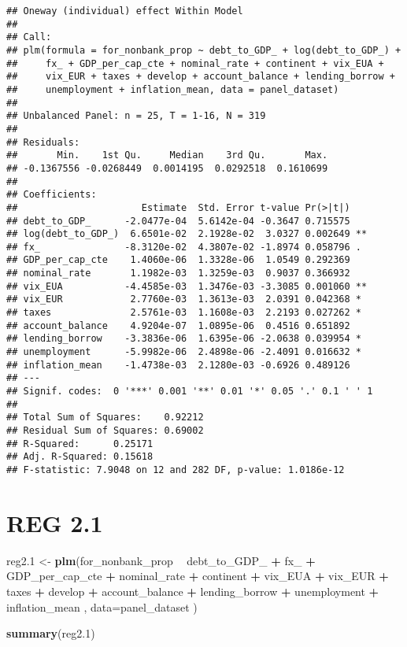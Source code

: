 \documentclass[]{article}
\newenvironment{Shaded}{\begin{snugshade}}{\end{snugshade}}
\newcommand{\KeywordTok}[1]{\textcolor[rgb]{0.13,0.29,0.53}{\textbf{#1}}}
\newcommand{\DataTypeTok}[1]{\textcolor[rgb]{0.13,0.29,0.53}{#1}}
\newcommand{\DecValTok}[1]{\textcolor[rgb]{0.00,0.00,0.81}{#1}}
\newcommand{\StringTok}[1]{\textcolor[rgb]{0.31,0.60,0.02}{#1}}
\newcommand{\OperatorTok}[1]{\textcolor[rgb]{0.81,0.36,0.00}{\textbf{#1}}}
\newcommand{\NormalTok}[1]{#1}
\begin{document}
\begin{verbatim}
## Oneway (individual) effect Within Model
## 
## Call:
## plm(formula = for_nonbank_prop ~ debt_to_GDP_ + log(debt_to_GDP_) + 
##     fx_ + GDP_per_cap_cte + nominal_rate + continent + vix_EUA + 
##     vix_EUR + taxes + develop + account_balance + lending_borrow + 
##     unemployment + inflation_mean, data = panel_dataset)
## 
## Unbalanced Panel: n = 25, T = 1-16, N = 319
## 
## Residuals:
##       Min.    1st Qu.     Median    3rd Qu.       Max. 
## -0.1367556 -0.0268449  0.0014195  0.0292518  0.1610699 
## 
## Coefficients:
##                      Estimate  Std. Error t-value Pr(>|t|)   
## debt_to_GDP_      -2.0477e-04  5.6142e-04 -0.3647 0.715575   
## log(debt_to_GDP_)  6.6501e-02  2.1928e-02  3.0327 0.002649 **
## fx_               -8.3120e-02  4.3807e-02 -1.8974 0.058796 . 
## GDP_per_cap_cte    1.4060e-06  1.3328e-06  1.0549 0.292369   
## nominal_rate       1.1982e-03  1.3259e-03  0.9037 0.366932   
## vix_EUA           -4.4585e-03  1.3476e-03 -3.3085 0.001060 **
## vix_EUR            2.7760e-03  1.3613e-03  2.0391 0.042368 * 
## taxes              2.5761e-03  1.1608e-03  2.2193 0.027262 * 
## account_balance    4.9204e-07  1.0895e-06  0.4516 0.651892   
## lending_borrow    -3.3836e-06  1.6395e-06 -2.0638 0.039954 * 
## unemployment      -5.9982e-06  2.4898e-06 -2.4091 0.016632 * 
## inflation_mean    -1.4738e-03  2.1280e-03 -0.6926 0.489126   
## ---
## Signif. codes:  0 '***' 0.001 '**' 0.01 '*' 0.05 '.' 0.1 ' ' 1
## 
## Total Sum of Squares:    0.92212
## Residual Sum of Squares: 0.69002
## R-Squared:      0.25171
## Adj. R-Squared: 0.15618
## F-statistic: 7.9048 on 12 and 282 DF, p-value: 1.0186e-12
\end{verbatim}

\section{REG 2.1}\label{reg-2.1}

\begin{Shaded}
\begin{Highlighting}[]
\NormalTok{reg2.}\DecValTok{1}\NormalTok{ <-}\StringTok{ }\KeywordTok{plm}\NormalTok{(for_nonbank_prop }\OperatorTok{~}\StringTok{  }\NormalTok{debt_to_GDP_ }\OperatorTok{+}\StringTok{ }\NormalTok{fx_ }\OperatorTok{+}\StringTok{ }\NormalTok{GDP_per_cap_cte }\OperatorTok{+}\StringTok{  }\NormalTok{nominal_rate }\OperatorTok{+}\StringTok{ }\NormalTok{continent }\OperatorTok{+}\StringTok{ }\NormalTok{vix_EUA }\OperatorTok{+}\StringTok{ }\NormalTok{vix_EUR }\OperatorTok{+}\StringTok{ }\NormalTok{taxes }\OperatorTok{+}\StringTok{ }\NormalTok{develop }\OperatorTok{+}\StringTok{ }\NormalTok{account_balance }\OperatorTok{+}\StringTok{ }\NormalTok{lending_borrow }\OperatorTok{+}\StringTok{ }\NormalTok{unemployment }\OperatorTok{+}\StringTok{ }\NormalTok{inflation_mean , }\DataTypeTok{data=}\NormalTok{panel_dataset  )}

\KeywordTok{summary}\NormalTok{(reg2.}\DecValTok{1}\NormalTok{)}
\end{Highlighting}
\end{Shaded}
\end{document}
